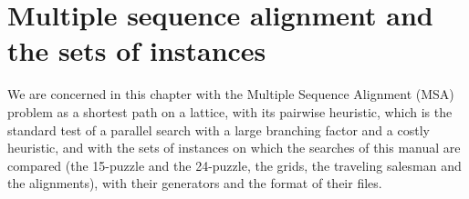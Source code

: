 \chapter{Multiple sequence alignment and the sets of instances}%
\label{ch:msa-instances}

\begin{center}
\end{center}

We are concerned in this chapter with the Multiple Sequence Alignment (MSA)
problem as a shortest path on a lattice, with its pairwise heuristic, which is
the standard test of a parallel search with a large branching factor and a
costly heuristic, and with the sets of instances on which the searches of this
manual are compared (the 15-puzzle and the 24-puzzle, the grids, the traveling
salesman and the alignments), with their generators and the format of their
files.

